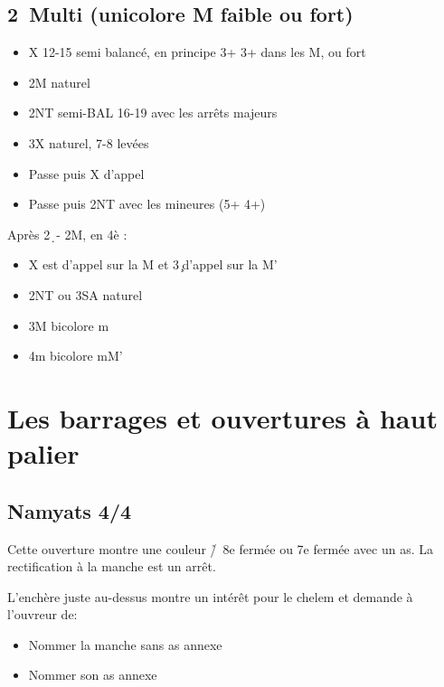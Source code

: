 \documentclass[a4paper]{article}
\begin{document}
\subsection{2\pdfd\ Multi (unicolore M faible ou fort)}

\begin{itemize}
\item X 12-15 semi balancé, en principe 3+ 3+ dans les M, ou fort

\item 2M naturel

\item 2NT semi-BAL 16-19 avec les arrêts majeurs

\item 3X naturel, 7-8 levées

\item Passe puis X d'appel

\item Passe puis 2NT avec les mineures (5+ 4+)

\end{itemize}

Après 2\d\ - 2M, en 4è :

\begin{itemize}
\item X est d'appel sur la M et 3\c\ d'appel sur la M'

\item 2NT ou 3SA naturel

\item 3M bicolore m 

\item 4m bicolore mM'

\end{itemize}

\section{Les barrages et ouvertures à haut palier}

\subsection{Namyats 4\pdfc/4\pdfd}

Cette ouverture montre une couleur \h /\s\ 8e fermée ou 7e fermée avec un as.
La rectification à la manche est un arrêt.

L'enchère juste au-dessus montre un intérêt pour le chelem et demande à l'ouvreur de:

\begin{itemize}
\item Nommer la manche sans as annexe

\item Nommer son as annexe

\end{itemize}
\end{document}
